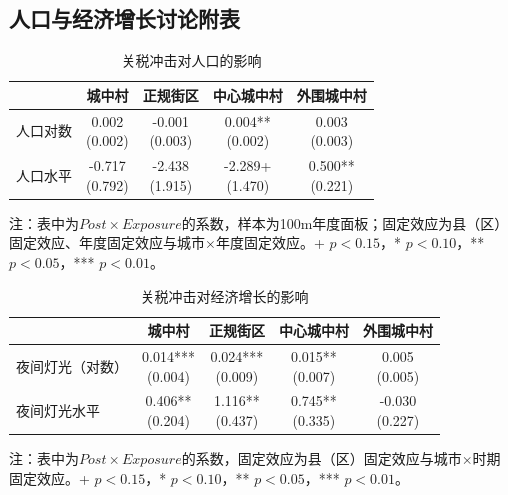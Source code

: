 \documentclass[a4paper,12pt]{report}
\begin{document}
\subsection{人口与经济增长讨论附表}
\begin{table}[H]
\centering
\caption{关税冲击对人口的影响}
\label{tab:discuss_pop}
\begin{tabular*}{\textwidth}{@{\extracolsep{\fill}}lcccc}
\toprule
 & 城中村 & 正规街区 & 中心城中村 & 外围城中村 \\
\midrule
人口对数 & \makecell{0.002\\(0.002)} & \makecell{-0.001\\(0.003)} & \makecell{0.004**\\(0.002)} & \makecell{0.003\\(0.003)} \\
人口水平 & \makecell{-0.717\\(0.792)} & \makecell{-2.438\\(1.915)} & \makecell{-2.289+\\(1.470)} & \makecell{0.500**\\(0.221)} \\
\bottomrule
\end{tabular*}
\vspace{0.2cm}

\par\raggedright{} 注：表中为$Post\times Exposure$的系数，样本为100m年度面板；固定效应为县（区）固定效应、年度固定效应与城市$\times$年度固定效应。+ $p<0.15$，* $p<0.10$，** $p<0.05$，*** $p<0.01$。
\end{table}

\begin{table}[H]
\centering
\caption{关税冲击对经济增长的影响}
\label{tab:discuss_ntl}
\begin{tabular*}{\textwidth}{@{\extracolsep{\fill}}lcccc}
\toprule
 & 城中村 & 正规街区 & 中心城中村 & 外围城中村 \\
\midrule
夜间灯光（对数） & \makecell{0.014***\\(0.004)} & \makecell{0.024***\\(0.009)} & \makecell{0.015**\\(0.007)} & \makecell{0.005\\(0.005)} \\
夜间灯光水平 & \makecell{0.406**\\(0.204)} & \makecell{1.116**\\(0.437)} & \makecell{0.745**\\(0.335)} & \makecell{-0.030\\(0.227)} \\
\bottomrule
\end{tabular*}
\vspace{0.2cm}

\par\raggedright{} 注：表中为$Post\times Exposure$的系数，固定效应为县（区）固定效应与城市$\times$时期固定效应。+ $p<0.15$，* $p<0.10$，** $p<0.05$，*** $p<0.01$。
\end{table}
\end{document}
